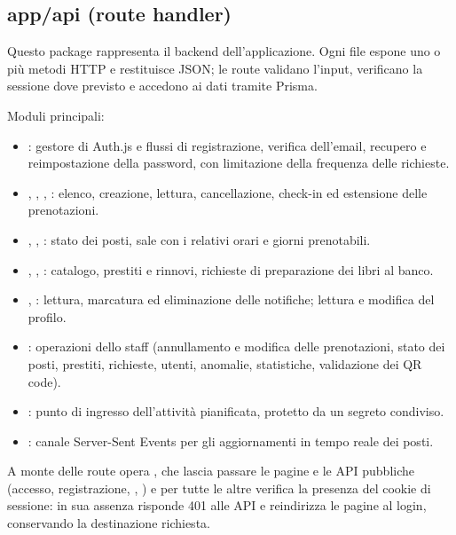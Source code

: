 \documentclass[11pt,a4paper,oneside,openany]{book}
\begin{document}

\subsection{app/api (route handler)}

Questo package rappresenta il backend dell'applicazione. Ogni file
 espone uno o più metodi HTTP e restituisce JSON; le route
validano l'input, verificano la sessione dove previsto e accedono ai dati
tramite Prisma.

Moduli principali:
\begin{itemize}
  \item {}: gestore di Auth.js e flussi di registrazione,
        verifica dell'email, recupero e reimpostazione della password, con
        limitazione della frequenza delle richieste.
  \item {}, ,
        , :
        elenco, creazione, lettura, cancellazione, check-in ed estensione delle
        prenotazioni.
  \item {}, , : stato dei
        posti, sale con i relativi orari e giorni prenotabili.
  \item {}, , : catalogo, prestiti e
        rinnovi, richieste di preparazione dei libri al banco.
  \item {}, : lettura, marcatura ed eliminazione
        delle notifiche; lettura e modifica del profilo.
  \item {}: operazioni dello staff (annullamento e modifica delle
        prenotazioni, stato dei posti, prestiti, richieste, utenti, anomalie,
        statistiche, validazione dei QR code).
  \item {}: punto di ingresso dell'attività pianificata,
        protetto da un segreto condiviso.
  \item {}: canale Server-Sent Events per gli aggiornamenti in
        tempo reale dei posti.
\end{itemize}

A monte delle route opera , che lascia passare le
pagine e le API pubbliche (accesso, registrazione, ,
) e per tutte le altre verifica la presenza del cookie di
sessione: in sua assenza risponde 401 alle API e reindirizza le pagine al
login, conservando la destinazione richiesta.
\end{document}
